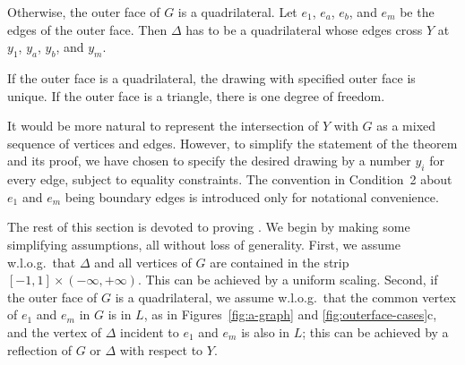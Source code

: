 \begin{thm}
\begin{compactenum}[a)]
\item Otherwise, the outer face of $G$ is a quadrilateral.  Let $e_1$,
  $e_a$, $e_b$, and $e_m$ be the %
  edges of the outer face.  Then $\Delta$ has to be a quadrilateral
  whose edges cross $Y$ at $y_1$, $y_a$, $y_b$, and $y_m$.
\end{compactenum}
If the outer face is a quadrilateral, the drawing with specified outer
face is unique. If the outer face is a triangle, there is one degree
of freedom.
\end{thm}

It would be more natural to represent the intersection of $Y$ with $G$
as a mixed sequence of vertices and edges. However, to simplify the
statement of the theorem and its proof, we have chosen to specify the
desired drawing by a number $y_i$ for every edge, subject to equality
constraints. %
The convention in Condition~2 about $e_1$ and $e_m$ being boundary
edges is introduced only for
 notational convenience.


The rest of this section is devoted to proving . We begin by making some simplifying assumptions, all without loss of generality. 
%
%
%
First, we assume w.l.o.g.\ that $\Delta$ and all vertices of $G$ are
contained in the strip $[-1,1]\times(-\infty,+\infty)$.  This can be
achieved by a uniform scaling.  Second,
if the outer face of $G$ is
 a quadrilateral,
 we assume w.l.o.g.\
that the common vertex of $e_1$ and
$e_m$ in $G$ is in $L$, as in Figures~\ref{fig:a-graph} and
\ref{fig:outerface-cases}c,
and the
vertex of $\Delta$ incident to $e_1$ and $e_m$ is also in $L$;
this can be achieved by a
reflection of $G$ or $\Delta$ with respect to $Y$.



